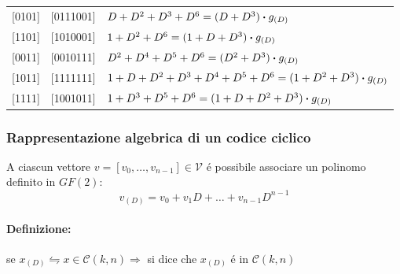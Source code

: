 \begin{itemize}
{\begin{table}[H]
\begin{tabular}{ccl}
                            {[}0101{]} & {[}0111001{]}     &$D+D^2+D^3+D^6 =                 (D+D^3)\dotproduct g_{(D)}$\\
                            {[}1101{]} & {[}1010001{]}     &$1+D^2+D^6 =                   (1+D+D^3)\dotproduct g_{(D)}$\\
                            {[}0011{]} & {[}0010111{]}     &$D^2+D^4+D^5+D^6 =             (D^2+D^3)\dotproduct g_{(D)}$\\
                            {[}1011{]} & {[}1111111{]}     &$1+D+D^2+D^3+D^4+D^5+D^6 =   (1+D^2+D^3)\dotproduct g_{(D)}$\\
                            {[}1111{]} & {[}1001011{]}     &$1+D^3+D^5+D^6 =           (1+D+D^2+D^3)\dotproduct g_{(D)}$
                            \end{tabular}
                        \end{table}
                    }
                \end{itemize}
        \subsubsection{Rappresentazione algebrica di un codice ciclico}
            A ciascun vettore $v = [v_0,\dots,v_{n-1}]\in \mathcal{V}$ é possibile associare un polinomo definito in $GF(2)$:
            \[
                v_{(D)} = v_0 + v_1 D+\dots+ v_{n-1}D^{n-1}    
            \]
            \paragraph{Definizione:} se $x_{(D)} \leftrightharpoons x\in \mathcal{C}(k,n) \Rightarrow$ si dice
            che $x_{(D)}$ é in $\mathcal{C}(k,n)$
